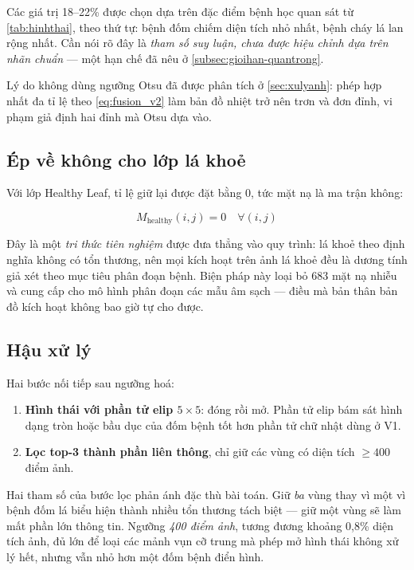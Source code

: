 Các giá trị 18--22\% được chọn dựa trên đặc điểm bệnh học quan sát từ
\cref{tab:hinhthai}, theo thứ tự: bệnh đốm chiếm diện tích nhỏ nhất, bệnh cháy lá
lan rộng nhất. Cần nói rõ đây là \emph{tham số suy luận, chưa được hiệu chỉnh dựa
trên nhãn chuẩn} --- một hạn chế đã nêu ở \cref{subsec:gioihan-quantrong}.

Lý do không dùng ngưỡng Otsu đã được phân tích ở \cref{sec:xulyanh}: phép hợp nhất
đa tỉ lệ theo \cref{eq:fusion_v2} làm bản đồ nhiệt trở nên trơn và đơn đỉnh, vi
phạm giả định hai đỉnh mà Otsu dựa vào.

\subsection{Ép về không cho lớp lá khoẻ}

Với lớp Healthy Leaf, tỉ lệ giữ lại được đặt bằng 0, tức mặt nạ là ma trận không:

\begin{equation}
    M_{\text{healthy}}(i,j) = 0 \quad \forall (i,j)
    \label{eq:hardzero}
\end{equation}

Đây là một \emph{tri thức tiên nghiệm} được đưa thẳng vào quy trình: lá khoẻ theo
định nghĩa không có tổn thương, nên mọi kích hoạt trên ảnh lá khoẻ đều là dương
tính giả xét theo mục tiêu phân đoạn bệnh. Biện pháp này loại bỏ \num{683} mặt nạ
nhiễu và cung cấp cho mô hình phân đoạn các mẫu âm sạch --- điều mà bản thân bản đồ
kích hoạt không bao giờ tự cho được.

\subsection{Hậu xử lý}

Hai bước nối tiếp sau ngưỡng hoá:

\begin{enumerate}
    \item \textbf{Hình thái với phần tử elip $5 \times 5$}: đóng rồi mở. Phần tử
          elip bám sát hình dạng tròn hoặc bầu dục của đốm bệnh tốt hơn phần tử
          chữ nhật dùng ở V1.
    \item \textbf{Lọc top-3 thành phần liên thông}, chỉ giữ các vùng có diện tích
          $\geq 400$ điểm ảnh.
\end{enumerate}

Hai tham số của bước lọc phản ánh đặc thù bài toán. Giữ \emph{ba} vùng thay vì một
vì bệnh đốm lá biểu hiện thành nhiều tổn thương tách biệt --- giữ một vùng sẽ làm
mất phần lớn thông tin. Ngưỡng \emph{400 điểm ảnh}, tương đương khoảng 0,8\% diện
tích ảnh, đủ lớn để loại các mảnh vụn cỡ trung mà phép mở hình thái không xử lý
hết, nhưng vẫn nhỏ hơn một đốm bệnh điển hình.

